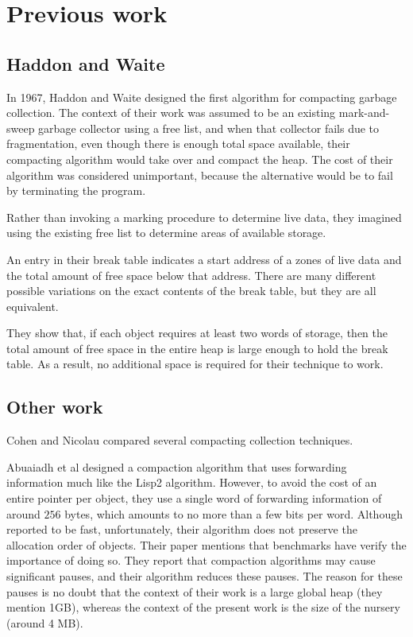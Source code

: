 \section{Previous work}

\subsection{Haddon and Waite}

In 1967, Haddon and Waite \cite{Haddon:1967} designed the first
algorithm for compacting garbage collection.  The context of their
work was assumed to be an existing mark-and-sweep garbage collector
using a free list, and when that collector fails due to fragmentation,
even though there is enough total space available, their compacting
algorithm would take over and compact the heap.  The cost of their
algorithm was considered unimportant, because the alternative would be
to fail by terminating the program.

Rather than invoking a marking procedure to determine live data, they
imagined using the existing free list to determine areas of available
storage. 

An entry in their break table indicates a start address of a zones of
live data and the total amount of free space below that address.
There are many different possible variations on the exact contents of
the break table, but they are all equivalent.

They show that, if each object requires at least two words of storage,
then the total amount of free space in the entire heap is large enough
to hold the break table.  As a result, no additional space is
required for their technique to work.

\subsection{Other work}

Cohen and Nicolau \cite{Cohen:1983:CCA:69575.357226} compared several
compacting collection techniques.

Abuaiadh et al \cite{Abuaiadh:2004:EPH:1028976.1028995} designed a
compaction algorithm that uses forwarding information much like the
Lisp2 algorithm.  However, to avoid the cost of an entire pointer per
object, they use a single word of forwarding information of around
$256$ bytes, which amounts to no more than a few bits per word.
Although reported to be fast, unfortunately, their algorithm does not
preserve the allocation order of objects.  Their paper mentions that
benchmarks have verify the importance of doing so.  They report that
compaction algorithms may cause significant pauses, and their
algorithm reduces these pauses.  The reason for these pauses is no
doubt that the context of their work is a large global heap (they
mention 1GB), whereas the context of the present work is the size of
the nursery (around 4 MB).

